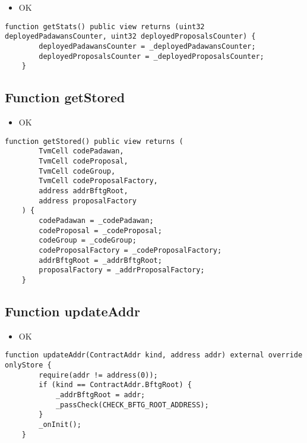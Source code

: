 \begin{itemize}
\item OK
\end{itemize}

\begin{lstlisting}[firstnumber=246]
    function getStats() public view returns (uint32 deployedPadawansCounter, uint32 deployedProposalsCounter) {
        deployedPadawansCounter = _deployedPadawansCounter;
        deployedProposalsCounter = _deployedProposalsCounter;
    }
\end{lstlisting}

\subsection{Function getStored}

\begin{itemize}
\item OK
\end{itemize}

\begin{lstlisting}[firstnumber=230]
    function getStored() public view returns (
        TvmCell codePadawan,
        TvmCell codeProposal,
        TvmCell codeGroup,
        TvmCell codeProposalFactory,
        address addrBftgRoot,
        address proposalFactory
    ) {
        codePadawan = _codePadawan;
        codeProposal = _codeProposal;
        codeGroup = _codeGroup;
        codeProposalFactory = _codeProposalFactory;
        addrBftgRoot = _addrBftgRoot;
        proposalFactory = _addrProposalFactory;
    }
\end{lstlisting}

\subsection{Function updateAddr}

\begin{itemize}
\item OK
\end{itemize}

\begin{lstlisting}[firstnumber=123]
    function updateAddr(ContractAddr kind, address addr) external override onlyStore {
        require(addr != address(0));
        if (kind == ContractAddr.BftgRoot) {
            _addrBftgRoot = addr;
            _passCheck(CHECK_BFTG_ROOT_ADDRESS);
        }
        _onInit();
    }
\end{lstlisting}

